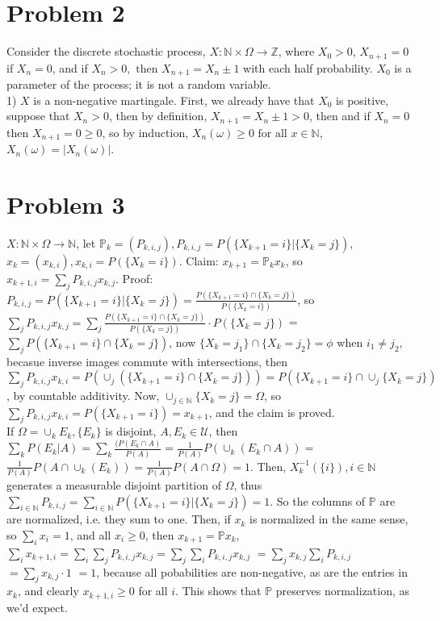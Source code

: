 \documentclass[12pt]{article}
\newcommand{\fall}[0] { \textrm{ for all } }
\newcommand{\then}[0] { \textrm{ then } }
\newcommand{\nats}[0] { \mathbb{N}}
\newcommand{\ints}[0] { \mathbb{Z}}
\newcommand{\U}[0] { \mathcal{U} }
\newcommand{\om}[0] { \omega }
\newcommand{\Om}[0] { \Omega }
\newcommand{\rarw}[0] { \rightarrow }
\begin{document}
\section*{Problem 2}

Consider the discrete stochastic process, $X: \nats \times \Om \rarw \ints$, where $X_0 > 0$, $X_{n+1} = 0$ if $X_n=0$, and if $X_n>0, \then X_{n+1} = X_n \pm 1$ with each half probability. $X_0$ is a parameter of the process; it is not a random variable.\\

1) $X$ is a non-negative martingale. First, we already have that $X_0$ is positive, suppose that $X_n > 0$, then by definition, $X_{n+1} = X_n \pm 1 > 0$, then and if $X_n = 0$ then $X_{n+1} = 0 \ge 0$, so by induction, $X_n(\om) \ge 0 \fall x\in \nats$, $X_n(\om) = |X_n(\om)|$. \\




\section*{Problem 3}

$X:\nats \times \Om \rarw \nats$, let $\mathbb{P}_k = (P_{k,i,j}), P_{k,i,j} = P(\{ X_{k+1} = i \} | \{X_k = j \})$, $x_k = (x_{k,i}), x_{k,i} = P(\{ X_k = i\})$. Claim: $x_{k+1} = \mathbb{P}_k x_k$, so $x_{k+1,i} = \sum_j P_{k,i,j} x_{k,j}$. Proof: $P_{k,i,j}  = P(\{ X_{k+1} = i \} | \{ X_k = j \}) = \frac{ P(\{ X_{k+1} = i\} \cap \{ X_k = j \}) } { P(\{X_k = i  \}) }$, so $ \sum_j P_{k,i,j} x_{k,j} = \sum_j \frac{ P(\{ X_{k+1} = i\} \cap \{ X_k = j \}) } { P(\{X_k = j  \}) } \cdot P(\{X_k = j  \}) $ = $\sum_j P(\{ X_{k+1} = i\} \cap \{ X_k = j \}) $, now  $ \{ X_{k} = j_1\} \cap \{ X_{k} = j_2\} = \phi $ when $i_1 \not = j_2$, becasue inverse images commute with intersections, then  $ \sum_j P_{k,i,j} x_{k,i}  = P \left( \cup_j \left( \{ X_{k+1} = i\} \cap \{ X_k = j \}  \right) \right) =  P \left( \{ X_{k+1} = i \}  \cap \cup_j \{ X_{k} = j\} \right)$, by countable additivity. Now, $\cup_{j \in \nats} \{ X_{k} = j\} = \Om$, so $\sum_j P_{k,i,j} x_{k,i}  =  P \left( \{ X_{k+1} = i \} \right) = x_{k+1} $, and the claim is proved. \\

If $\Om = \cup_k E_k, \{E_k \}$ is disjoint, $A, E_k \in \U$, then $\sum_k P(E_k | A ) = \sum_k \frac{(P(E_k \cap A)}{P(A)} = \frac{1}{P(A)} P \left(  \cup_k (E_k \cap A )\right) = $ 
$\frac{1}{P(A)} P \left( A \cap \cup_k (E_k  )\right) = \frac{1}{P(A)} P \left( A \cap \Om \right) = 1$. Then, $X_k^{-1}(\{i\}), i \in \nats$ generates a measurable disjoint partition of $\Om$, thus $ \sum_{i \in \nats} P_{k,i,j} = \sum_{i \in \nats} P(\{ X_{k+1} = i \} | \{X_k = j \}) = 1$. So the columns of $\mathbb{P}$ are are normalized, i.e. they sum to one. Then, if $x_k$ is normalized in the same sense, so $\sum_i x_i = 1$, and all $x_i \ge 0$, then $x_{k+1} = \mathbb{P} x_k$, $ \sum_i x_{k+1,i} = \sum_i \sum_j P_{k,i,j} x_{k,j} = \sum_j \sum_i P_{k,i,j} x_{k,j} $ $ = \sum_j  x_{k,j} \sum_i P_{k,i,j} $  $ = \sum_j  x_{k,j} \cdot 1 $ $ = 1$, because all pobabilities are non-negative, as are the entries in $x_k$, and clearly $x_{{k+1},i} \ge 0$ for all $i$. This shows that $\mathbb{P}$ preserves normalization, as we'd expect.
\end{document}
